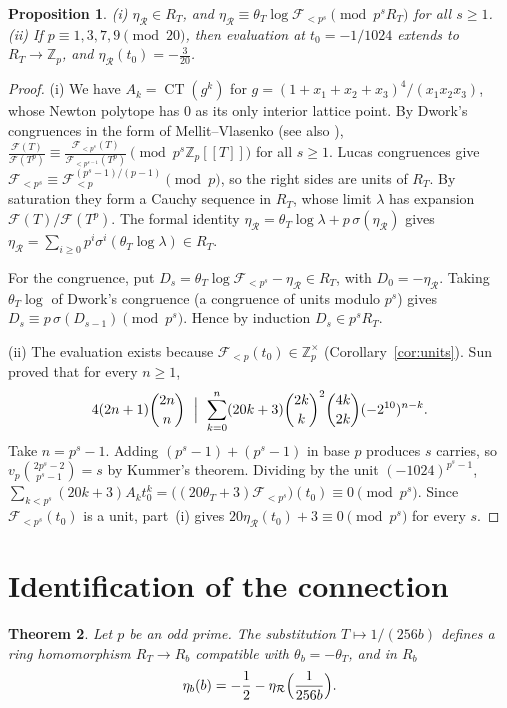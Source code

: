 \documentclass[11pt]{amsart}
\newtheorem{theorem}{Theorem}[section]
\newtheorem{proposition}[theorem]{Proposition}
\theoremstyle{definition}
\theoremstyle{remark}
\newcommand{\Zp}{\mathbb{Z}_p}
\newcommand{\CT}{\operatorname{CT}}
\newcommand{\cF}{\mathcal{F}}
\begin{document}
\begin{proposition}\label{prop:dwork}
(i) $\eta_{\mathcal R}\in R_T$, and $\eta_{\mathcal R}\equiv\theta_T\log\cF_{<p^s}\pmod{p^sR_T}$ for all $s\ge1$.
(ii) If $p\equiv1,3,7,9\pmod{20}$, then evaluation at $t_0=-1/1024$ extends to $R_T\to\Zp$, and
$\eta_{\mathcal R}(t_0)=-\frac3{20}$.
\end{proposition}
\begin{proof}
(i) We have $A_k=\CT(g^k)$ for $g=(1+x_1+x_2+x_3)^4/(x_1x_2x_3)$, whose Newton polytope has $0$ as
its only interior lattice point. By Dwork's congruences in the form of Mellit--Vlasenko \cite{MV}
(see also \cite[\S1]{BV2}),
$\frac{\cF(T)}{\cF(T^p)}\equiv\frac{\cF_{<p^s}(T)}{\cF_{<p^{s-1}}(T^p)}\pmod{p^s\Zp[[T]]}$ for all
$s\ge1$. Lucas congruences give $\cF_{<p^s}\equiv\cF_{<p}^{(p^s-1)/(p-1)}\pmod p$, so the right
sides are units of $R_T$. By saturation they form a Cauchy sequence in $R_T$, whose limit
$\lambda$ has expansion $\cF(T)/\cF(T^p)$. The formal identity
$\eta_{\mathcal R}=\theta_T\log\lambda+p\,\sigma(\eta_{\mathcal R})$ gives
$\eta_{\mathcal R}=\sum_{i\ge0}p^i\sigma^i(\theta_T\log\lambda)\in R_T$.

For the congruence, put $D_s=\theta_T\log\cF_{<p^s}-\eta_{\mathcal R}\in R_T$, with $D_0=-\eta_{\mathcal R}$.
Taking $\theta_T\log$ of Dwork's congruence (a congruence of units modulo $p^s$) gives
$D_s\equiv p\,\sigma(D_{s-1})\pmod{p^s}$. Hence by induction $D_s\in p^sR_T$.

(ii) The evaluation exists because $\cF_{<p}(t_0)\in\Zp^\times$ (Corollary~\ref{cor:units}).
Sun proved \cite[Theorem 1.2, (1.5)]{SunEJC} that for every $n\ge1$,
\[
 4(2n+1)\binom{2n}n\ \Bigm|\ \sum_{k=0}^n(20k+3)\binom{2k}k^2\binom{4k}{2k}(-2^{10})^{n-k}.
\]
Take $n=p^s-1$. Adding $(p^s-1)+(p^s-1)$ in base $p$ produces $s$ carries, so
$v_p\binom{2p^s-2}{p^s-1}=s$ by Kummer's theorem. Dividing by the unit $(-1024)^{p^s-1}$,
$\sum_{k<p^s}(20k+3)A_kt_0^k=\bigl((20\theta_T+3)\cF_{<p^s}\bigr)(t_0)\equiv0\pmod{p^s}$. Since
$\cF_{<p^s}(t_0)$ is a unit, part~(i) gives $20\eta_{\mathcal R}(t_0)+3\equiv0\pmod{p^s}$ for every
$s$.
\end{proof}

\section{Identification of the connection}\label{sec:identification}

\begin{theorem}\label{thm:identification}
Let $p$ be an odd prime. The substitution $T\mapsto1/(256b)$ defines a ring homomorphism
$R_T\to R_b$ compatible with $\theta_b=-\theta_T$, and in $R_b$
\[
 \eta_b(b)=-\frac12-\eta_{\mathcal R}\Bigl(\frac1{256b}\Bigr).
\]
\end{theorem}
\end{document}
